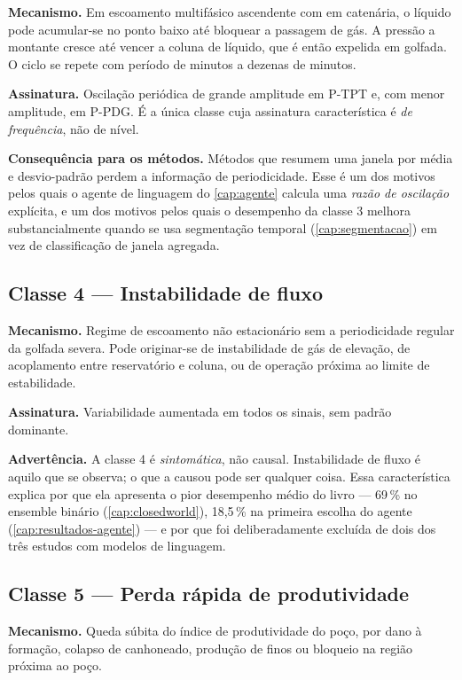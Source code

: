 \textbf{Mecanismo.} Em escoamento multifásico ascendente com  em catenária,
o líquido pode acumular-se no ponto baixo até bloquear a passagem de gás. A pressão a
montante cresce até vencer a coluna de líquido, que é então expelida em golfada. O
ciclo se repete com período de minutos a dezenas de minutos.

\textbf{Assinatura.} Oscilação periódica de grande amplitude em P-TPT e, com menor
amplitude, em P-PDG. É a única classe cuja assinatura característica é \emph{de
frequência}, não de nível.

\textbf{Consequência para os métodos.} Métodos que resumem uma janela por média e
desvio-padrão perdem a informação de periodicidade. Esse é um dos motivos pelos quais
o agente de linguagem do \cref{cap:agente} calcula uma \emph{razão de oscilação}
explícita, e um dos motivos pelos quais o desempenho da classe 3 melhora
substancialmente quando se usa segmentação temporal (\cref{cap:segmentacao}) em vez de
classificação de janela agregada.

\subsection{Classe 4 --- Instabilidade de fluxo}

\textbf{Mecanismo.} Regime de escoamento não estacionário sem a periodicidade regular
da golfada severa. Pode originar-se de instabilidade de gás de elevação, de
acoplamento entre reservatório e coluna, ou de operação próxima ao limite de
estabilidade.

\textbf{Assinatura.} Variabilidade aumentada em todos os sinais, sem padrão dominante.

\textbf{Advertência.} A classe 4 é \emph{sintomática}, não causal. Instabilidade de
fluxo é aquilo que se observa; o que a causou pode ser qualquer coisa. Essa
característica explica por que ela apresenta o pior desempenho médio do livro --- 69\,\%
no ensemble binário (\cref{cap:closedworld}), 18,5\,\% na primeira escolha do agente
(\cref{cap:resultados-agente}) --- e por que foi deliberadamente excluída de dois dos
três estudos com modelos de linguagem.

\subsection{Classe 5 --- Perda rápida de produtividade}

\textbf{Mecanismo.} Queda súbita do índice de produtividade do poço, por dano à
formação, colapso de canhoneado, produção de finos ou bloqueio na região próxima ao
poço.

